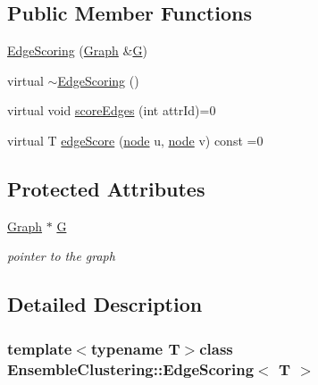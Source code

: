 \subsection*{Public Member Functions}
\begin{DoxyCompactItemize}
\item 
\hyperlink{class_ensemble_clustering_1_1_edge_scoring_a929532ab86b6e6a8dcbee7fc5f6c69b4}{Edge\-Scoring} (\hyperlink{class_ensemble_clustering_1_1_graph}{Graph} \&\hyperlink{class_ensemble_clustering_1_1_edge_scoring_a5f44e943d8b0609bb7e866d785502300}{G})
\item 
virtual \hyperlink{class_ensemble_clustering_1_1_edge_scoring_aa79bc49f70d7d833aa1ed07c50e3e15c}{$\sim$\-Edge\-Scoring} ()
\item 
virtual void \hyperlink{class_ensemble_clustering_1_1_edge_scoring_adfce8d05bbaaa6526ca4e22af6897c2d}{score\-Edges} (int attr\-Id)=0
\item 
virtual T \hyperlink{class_ensemble_clustering_1_1_edge_scoring_aa61da87fb5141e85134f6cdc6564e9ca}{edge\-Score} (\hyperlink{namespace_ensemble_clustering_ae829290aeccd1a420b17a37fd901f114}{node} u, \hyperlink{namespace_ensemble_clustering_ae829290aeccd1a420b17a37fd901f114}{node} v) const =0
\end{DoxyCompactItemize}
\subsection*{Protected Attributes}
\begin{DoxyCompactItemize}
\item 
\hyperlink{class_ensemble_clustering_1_1_graph}{Graph} $\ast$ \hyperlink{class_ensemble_clustering_1_1_edge_scoring_a5f44e943d8b0609bb7e866d785502300}{G}
\begin{DoxyCompactList}\small\item\em pointer to the graph \end{DoxyCompactList}\end{DoxyCompactItemize}


\subsection{Detailed Description}
\subsubsection*{template$<$typename T$>$class Ensemble\-Clustering\-::\-Edge\-Scoring$<$ T $>$}



